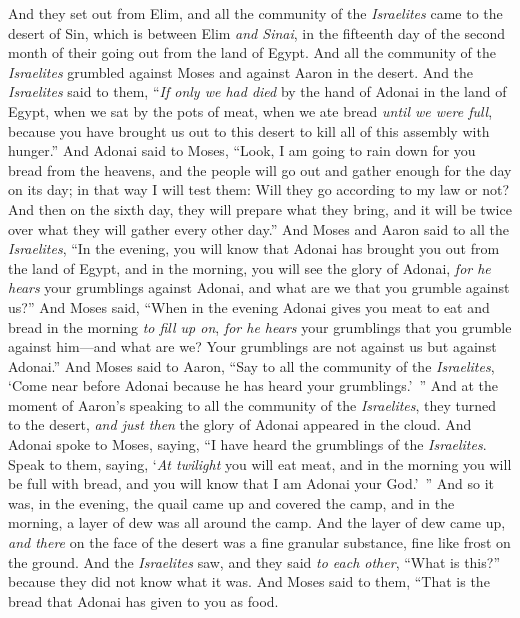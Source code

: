 \begin{biblechapter} %
 And they set out from Elim, and all the community of the \textit{Israelites} came to the desert of Sin, which is between Elim \textit{and Sinai}, in the fifteenth day of the second month of their going out from the land of Egypt.
\verse And all the community of the \textit{Israelites} grumbled against Moses and against Aaron in the desert.
\verse And the \textit{Israelites} said to them, “\textit{If only we had died} by the hand of Adonai in the land of Egypt, when we sat by the pots of meat, when we ate bread \textit{until we were full}, because you have brought us out to this desert to kill all of this assembly with hunger.”
\verse And Adonai said to Moses, “Look, I am going to rain down for you bread from the heavens, and the people will go out and gather enough for the day on its day; in that way I will test them: Will they go according to my law or not?
\verse And then on the sixth day, they will prepare what they bring, and it will be twice over what they will gather every other day.”
\verse And Moses and Aaron said to all the \textit{Israelites}, “In the evening, you will know that Adonai has brought you out from the land of Egypt,
\verse and in the morning, you will see the glory of Adonai, \textit{for he hears} your grumblings against Adonai, and what are we that you grumble against us?”
\verse And Moses said, “When in the evening Adonai gives you meat to eat and bread in the morning \textit{to fill up on}, \textit{for he hears} your grumblings that you grumble against him—and what are we? Your grumblings are not against us but against Adonai.”
\verse And Moses said to Aaron, “Say to all the community of the \textit{Israelites}, ‘Come near before Adonai because he has heard your grumblings.’ ”
\verse And at the moment of Aaron’s speaking to all the community of the \textit{Israelites}, they turned to the desert, \textit{and just then} the glory of Adonai appeared in the cloud.
\verse And Adonai spoke to Moses, saying,
\verse “I have heard the grumblings of the \textit{Israelites}. Speak to them, saying, ‘\textit{At twilight} you will eat meat, and in the morning you will be full with bread, and you will know that I am Adonai your God.’ ”
\verse And so it was, in the evening, the quail came up and covered the camp, and in the morning, a layer of dew was all around the camp.
\verse And the layer of dew came up, \textit{and there} on the face of the desert was a fine granular substance, fine like frost on the ground.
\verse And the \textit{Israelites} saw, and they said \textit{to each other}, “What is this?” because they did not know what it was. And Moses said to them, “That is the bread that Adonai has given to you as food.

\end{biblechapter}
